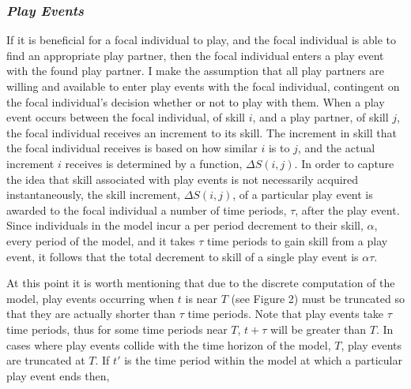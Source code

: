 \documentclass[12pt,letterpaper]{article}
\begin{document}
  
    \subsubsection{\it Play Events}
      \indent If it is beneficial for a focal individual to play, and the focal individual is able to find an appropriate play partner, then the focal individual enters a play event with the found play partner. %
      I make the assumption that all play partners are willing and available to enter play events with the focal individual, contingent on the focal individual's decision whether or not to play with them. %
      When a play event occurs between the focal individual, of skill $i$, and a play partner, of skill $j$, the focal individual receives an increment to its skill.
      The increment in skill that the focal individual receives is based on how similar $i$ is to $j$, and the actual increment $i$ receives is determined by a function, $\Delta S(i,j)$. %
      In order to capture the idea that skill associated with play events is not necessarily acquired instantaneously, the skill increment, $\Delta S(i,j)$, of a particular play event is awarded to the focal individual a number of time periods, $\tau$, after the play event.  
      Since individuals in the model incur a per period decrement to their skill, $\alpha$, every period of the model, and it takes $\tau$ time periods to gain skill from a play event, it follows that the total decrement to skill of a single play event is $\alpha \tau$. %
   
      At this point it is worth mentioning that due to the discrete computation of the model, play events occurring when $t$ is near $T$ (see Figure 2) must be truncated so that they are actually shorter than $\tau$ time periods. %
      Note that play events take $\tau$ time periods, thus for some time periods near $T$, $t+\tau$ will be greater than $T$.
      In cases where play events collide with the time horizon of the model, $T$, play events are truncated at $T$.
      If $t'$ is the time period within the model at which a particular play event ends then,
	
\end{document}
